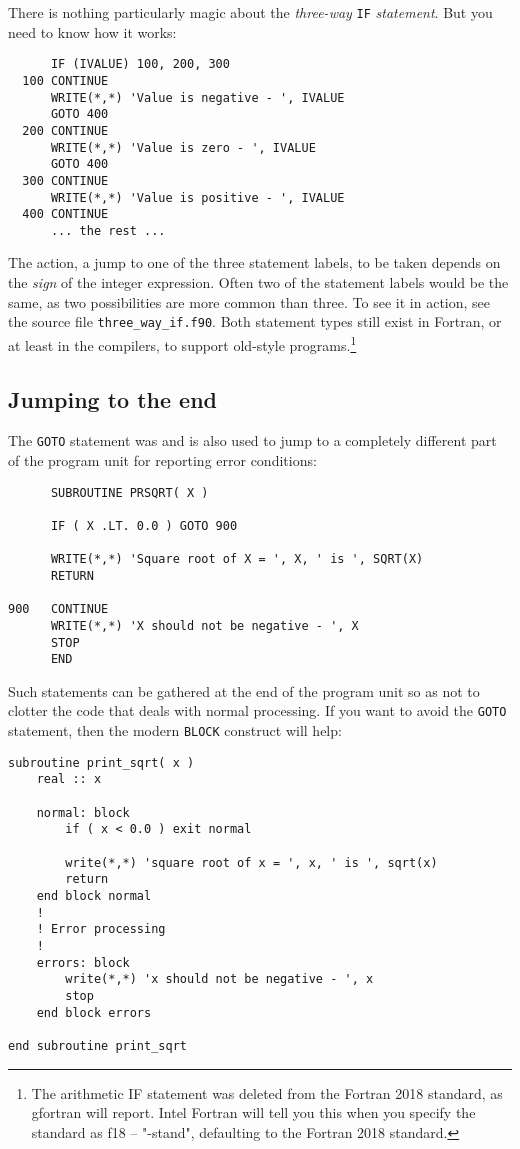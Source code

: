 There is nothing particularly magic about the \emph{three-way} \verb+IF+ \emph{statement}.
But you need to know how it works:
%
\begin{verbatim}
      IF (IVALUE) 100, 200, 300
  100 CONTINUE
      WRITE(*,*) 'Value is negative - ', IVALUE
      GOTO 400
  200 CONTINUE
      WRITE(*,*) 'Value is zero - ', IVALUE
      GOTO 400
  300 CONTINUE
      WRITE(*,*) 'Value is positive - ', IVALUE
  400 CONTINUE
      ... the rest ...
\end{verbatim}
%
The action, a jump to one of the three statement labels, to be taken depends on the
\emph{sign} of the integer expression. Often two of the statement labels would be the same,
as two possibilities are more common than three. To see it in action, see the source
file \verb+three_way_if.f90+. Both statement types still exist in Fortran, or at least
in the compilers, to support old-style programs.\footnote{The arithmetic IF statement
was deleted from the Fortran 2018 standard, as gfortran will report. Intel Fortran
will tell you this when you specify the standard as f18 -- "-stand", defaulting to the
Fortran 2018 standard.}


\subsection{Jumping to the end}
\label{jumpingtoend}
The \verb+GOTO+ statement was and is also used to jump to a completely different
part of the program unit for reporting error conditions:
%
\begin{verbatim}
      SUBROUTINE PRSQRT( X )

      IF ( X .LT. 0.0 ) GOTO 900

      WRITE(*,*) 'Square root of X = ', X, ' is ', SQRT(X)
      RETURN

900   CONTINUE
      WRITE(*,*) 'X should not be negative - ', X
      STOP
      END
\end{verbatim}

Such statements can be gathered at the end of the program unit so as not to clotter
the code that deals with normal processing. If you want to avoid the \verb+GOTO+ statement,
then the modern \verb+BLOCK+ construct will help:
%
\begin{verbatim}
subroutine print_sqrt( x )
    real :: x

    normal: block
        if ( x < 0.0 ) exit normal

        write(*,*) 'square root of x = ', x, ' is ', sqrt(x)
        return
    end block normal
    !
    ! Error processing
    !
    errors: block
        write(*,*) 'x should not be negative - ', x
        stop
    end block errors

end subroutine print_sqrt
\end{verbatim}

